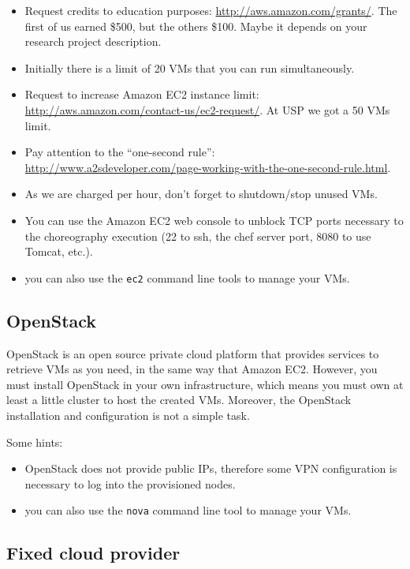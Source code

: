 \documentclass[a4paper, 10pt]{article}
\begin{document}
\begin{itemize}
\item Request credits to education purposes: \url{http://aws.amazon.com/grants/}. The first of us earned \$500, but the others \$100. Maybe it depends on your research project description.
\item Initially there is a limit of 20 VMs that you can run simultaneously.
\item Request to increase Amazon EC2 instance limit: \url{http://aws.amazon.com/contact-us/ec2-request/}. At USP we got a 50 VMs limit.
\item Pay attention to the ``one-second rule'': \\ \url{http://www.a2sdeveloper.com/page-working-with-the-one-second-rule.html}.
\item As we are charged per hour, don't forget to shutdown/stop unused VMs.
\item You can use the Amazon EC2 web console to unblock TCP ports necessary to the choreography execution (22 to ssh, the chef server port, 8080 to use Tomcat, etc.).
\item you can also use the \texttt{ec2} command line tools to manage your VMs.
\end{itemize}

\subsection{OpenStack}

OpenStack is an open source private cloud platform that provides services to retrieve VMs as you need, in the same way that Amazon EC2. However, you must install OpenStack in your own infrastructure, which means you must own at least a little cluster to host the created VMs. Moreover, the OpenStack installation and configuration is not a simple task.

Some hints:

\begin{itemize}
\item OpenStack does not provide public IPs, therefore some VPN configuration is necessary to log into the provisioned nodes.
\item you can also use the \texttt{nova} command line tool to manage your VMs.
\end{itemize}

\subsection{Fixed cloud provider}
\end{document}
